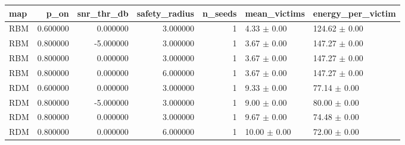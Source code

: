 \begin{tabular}{lrrrrll}
\toprule
map & p_on & snr_thr_db & safety_radius & n_seeds & mean_victims & energy_per_victim \\
\midrule
RBM & 0.600000 & 0.000000 & 3.000000 & 1 & 4.33 $\pm$ 0.00 & 124.62 $\pm$ 0.00 \\
RBM & 0.800000 & -5.000000 & 3.000000 & 1 & 3.67 $\pm$ 0.00 & 147.27 $\pm$ 0.00 \\
RBM & 0.800000 & 0.000000 & 3.000000 & 1 & 3.67 $\pm$ 0.00 & 147.27 $\pm$ 0.00 \\
RBM & 0.800000 & 0.000000 & 6.000000 & 1 & 3.67 $\pm$ 0.00 & 147.27 $\pm$ 0.00 \\
RDM & 0.600000 & 0.000000 & 3.000000 & 1 & 9.33 $\pm$ 0.00 & 77.14 $\pm$ 0.00 \\
RDM & 0.800000 & -5.000000 & 3.000000 & 1 & 9.00 $\pm$ 0.00 & 80.00 $\pm$ 0.00 \\
RDM & 0.800000 & 0.000000 & 3.000000 & 1 & 9.67 $\pm$ 0.00 & 74.48 $\pm$ 0.00 \\
RDM & 0.800000 & 0.000000 & 6.000000 & 1 & 10.00 $\pm$ 0.00 & 72.00 $\pm$ 0.00 \\
\bottomrule
\end{tabular}
